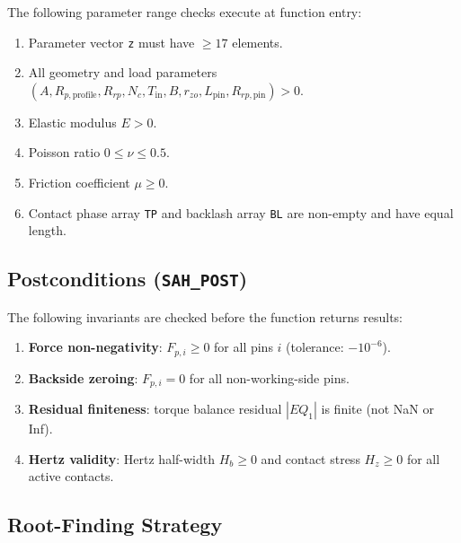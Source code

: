 \documentclass{article}
\begin{document}
The following parameter range checks execute at function entry:

\begin{tcolorbox}[colback=green!3!white,colframe=green!55!black,title=Precondition Contracts (SAH\_PRE),arc=4mm,boxrule=1pt]
\small
\begin{enumerate}[leftmargin=1.2em]
    \item Parameter vector \texttt{z} must have $\geq 17$ elements.
    \item All geometry and load parameters $(A, R_{p,\text{profile}}, R_{rp}, N_c, T_\text{in}, B, r_{zo}, L_\text{pin}, R_{rp,\text{pin}}) > 0$.
    \item Elastic modulus $E > 0$.
    \item Poisson ratio $0 \leq \nu \leq 0.5$.
    \item Friction coefficient $\mu \geq 0$.
    \item Contact phase array \texttt{TP} and backlash array \texttt{BL} are non-empty and have equal length.
\end{enumerate}
\end{tcolorbox}

\subsection{Postconditions (\texttt{SAH\_POST})}

The following invariants are checked before the function returns results:

\begin{tcolorbox}[colback=blue!3!white,colframe=blue!55!black,title=Postcondition Contracts (SAH\_POST),arc=4mm,boxrule=1pt]
\small
\begin{enumerate}[leftmargin=1.2em]
    \item \textbf{Force non-negativity}: $F_{p,i} \geq 0$ for all pins $i$ (tolerance: $-10^{-6}$).
    \item \textbf{Backside zeroing}: $F_{p,i} = 0$ for all non-working-side pins.
    \item \textbf{Residual finiteness}: torque balance residual $|EQ_1|$ is finite (not NaN or Inf).
    \item \textbf{Hertz validity}: Hertz half-width $H_b \geq 0$ and contact stress $H_z \geq 0$ for all active contacts.
\end{enumerate}
\end{tcolorbox}

\subsection{Root-Finding Strategy}
\end{document}
